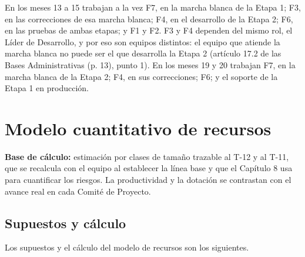 En los meses 13 a 15 trabajan a la vez F7, en la marcha blanca de la Etapa 1; F3, en las correcciones de esa marcha blanca; F4, en el desarrollo de la Etapa 2; F6, en las pruebas de ambas etapas; y F1 y F2. F3 y F4 dependen del mismo rol, el Líder de Desarrollo, y por eso son equipos distintos: el equipo que atiende la marcha blanca no puede ser el que desarrolla la Etapa 2 (artículo 17.2 de las Bases Administrativas (p. 13), punto 1). En los meses 19 y 20 trabajan F7, en la marcha blanca de la Etapa 2; F4, en sus correcciones; F6; y el soporte de la Etapa 1 en producción.

\section{Modelo cuantitativo de recursos}

\textbf{Base de cálculo:} estimación por clases de tamaño trazable al T-12 y al T-11, que se recalcula con el equipo al establecer la línea base y que el Capítulo 8 usa para cuantificar los riesgos. La productividad y la dotación se contrastan con el avance real en cada Comité de Proyecto.

\subsection{Supuestos y cálculo}

Los supuestos y el cálculo del modelo de recursos son los siguientes.

